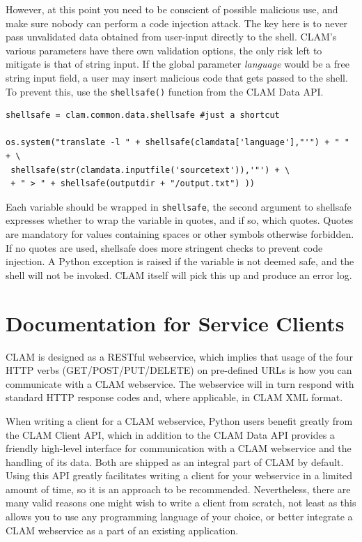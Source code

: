 \documentclass[a4paper,12pt]{report}
\begin{document}
However, at this point
you need to be conscient of possible malicious use, and make sure nobody can
perform a code injection attack. The key here is to never pass unvalidated data
obtained from user-input directly to the shell. CLAM's various parameters have
there own validation options, the only risk left to mitigate is that of string
input. If the global parameter \emph{language} would be a free string input
field, a user may insert malicious code that gets passed to the shell. To
prevent this, use the \texttt{shellsafe()} function from the CLAM Data API. 


\begin{verbatim}
shellsafe = clam.common.data.shellsafe #just a shortcut

os.system("translate -l " + shellsafe(clamdata['language'],"'") + " " + \
 shellsafe(str(clamdata.inputfile('sourcetext')),'"') + \
 + " > " + shellsafe(outputdir + "/output.txt") ))
\end{verbatim}

Each variable should be wrapped in \texttt{shellsafe}, the second argument to
shellsafe expresses whether to wrap the variable in quotes, and if so, which
quotes. Quotes are mandatory for values containing spaces or other symbols
otherwise forbidden. If no quotes are used, shellsafe does more stringent
checks to prevent code injection. A Python exception is raised if the variable
is not deemed safe, and the shell will not be invoked. CLAM itself will pick
this up and produce an error log.


\chapter{Documentation for Service Clients}

CLAM is designed as a RESTful webservice, which implies that usage of the four
HTTP verbs (GET/POST/PUT/DELETE) on pre-defined URLs is how you can communicate
with a CLAM webservice. The webservice will in turn respond with standard HTTP
response codes and, where applicable, in CLAM XML format.

When writing a client for a CLAM webservice, Python users benefit greatly from
the CLAM Client API, which in addition to the CLAM Data API provides a friendly
high-level interface for communication with a CLAM webservice and the handling
of its data. Both are shipped as an integral part of CLAM by default. Using
this API greatly facilitates writing a client for your webservice in a limited
amount of time, so it is an approach to be recommended. Nevertheless, there are
many valid reasons one might wish to write a client from scratch, not least as
this allows you to use any programming language of your choice, or better
integrate a CLAM webservice as a part of an existing application.
\end{document}
